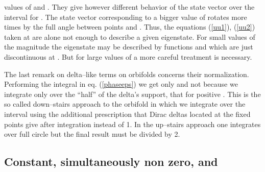 \documentclass[a4paper,12pt]{article}
\def\eps{\epsilon}
\def\ZZ{\mathbb Z}
\begin{document}
values of \myHighlight{$u^1(\eps)$}\coordHE{} and \myHighlight{$u^2(\eps)$}\coordHE{}. They give however different
behavior of the state vector over the interval  \myHighlight{$y\in[0,\eps]$}\coordHE{} for
\myHighlight{$\eps\ne0$}\coordHE{}. The state vector corresponding to a bigger value of \coordHE{}
rotates more times by the full angle \myHighlight{$2\pi$}\coordHE{} between points \coordHE{} and
\myHighlight{$y=\eps$}\coordHE{}. Thus, the equations (\ref{uu1}), (\ref{uu2}) taken at
\myHighlight{$\eps=0$}\coordHE{} are alone not enough to describe a given eigenstate. For
small values of the magnitude \coordHE{} the eigenstate may be described by
functions \coordHE{} and \coordHE{} which are just discontinuous at
\coordHE{}. But for large values of \coordHE{} a more careful treatment is
necessary. 


The last remark on delta--like terms on orbifolds concerns their
normalization. Performing the integral in eq. (\ref{phaseeps}) we get
only \coordHE{} and not \coordHE{} because we integrate only over the ``half''
of the delta's support, that for positive \coordHE{}. This is the so called 
down--stairs approach to 
the \myHighlight{$S^1/\ZZ_2$}\coordHE{} orbifold in which we integrate over the interval
\coordHE{} using the additional prescription that Dirac deltas
located at the fixed points give after integration \coordHE{} instead of
1. In the up--stairs approach one integrates over full circle \coordHE{}
but the final result must be divided by 2. 




\subsection{Constant, simultaneously non zero, \coordHE{} and
\coordHE{}} 
\end{document}
